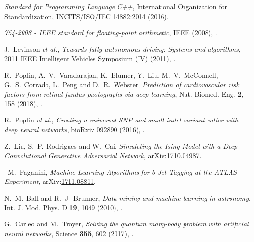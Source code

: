 \documentclass[11pt, a4paper]{report} %
\begin{document}
\begin{thebibliography}{99}
\textit{Standard for Programming Language C++}, International Organization for Standardization, INCITS/ISO/IEC 14882:2014 (2016).






\emph{754-2008 - {IEEE} standard for floating-point arithmetic}, IEEE (2008), .




J.~Levinson \textit{et al.}, \textit{Towards fully autonomous driving: Systems and algorithms}, 2011 IEEE Intelligent Vehicles Symposium (IV) (2011), .




R.~Poplin, A.~V.~Varadarajan, K.~Blumer, Y.~Liu, M.~V.~McConnell, G.~S.~Corrado, L.~Peng and D.~R.~Webster, \textit{Prediction of cardiovascular risk factors from retinal fundus photographs via deep learning}, Nat. Biomed. Eng. \textbf{2}, 158 (2018), .




R.~Poplin \textit{et al.}, \textit{Creating a universal SNP and small indel variant caller with deep neural networks}, bioRxiv 092890 (2016), .




Z.~Liu, S.~P.~Rodrigues and W.~Cai, \textit{Simulating the Ising Model with a Deep Convolutional Generative Adversarial Network}, arXiv:\href{https://arxiv.org/abs/1710.04987}{1710.04987}.



 \
M.~Paganini, \textit{Machine Learning Algorithms for $b$-Jet Tagging at the ATLAS Experiment}, arXiv:\href{https://arxiv.org/abs/1711.08811}{1711.08811}. 



N.~M.~Ball and R.~J.~Brunner, \textit{Data mining and machine learning in astronomy}, Int. J. Mod. Phys. D \textbf{19}, 1049 (2010), .




G.~Carleo and M.~Troyer, \textit{Solving the quantum many-body problem with artificial neural networks}, Science \textbf{355}, 602 (2017), .





\end{thebibliography}
\end{document}
